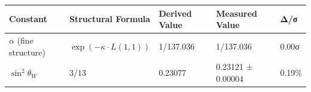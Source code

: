 \begin{longtable}[]{@{}lllll@{}}
\toprule
\begin{minipage}[b]{0.13\columnwidth}\raggedright
Constant\strut
\end{minipage} & \begin{minipage}[b]{0.25\columnwidth}\raggedright
Structural Formula\strut
\end{minipage} & \begin{minipage}[b]{0.20\columnwidth}\raggedright
Derived Value\strut
\end{minipage} & \begin{minipage}[b]{0.21\columnwidth}\raggedright
Measured Value\strut
\end{minipage} & \begin{minipage}[b]{0.07\columnwidth}\raggedright
Δ/σ\strut
\end{minipage}\tabularnewline
\midrule
\endhead
\begin{minipage}[t]{0.13\columnwidth}\raggedright
\(\alpha\) (fine structure)\strut
\end{minipage} & \begin{minipage}[t]{0.25\columnwidth}\raggedright
\(\exp(-\kappa \cdot L(1,1))\)\strut
\end{minipage} & \begin{minipage}[t]{0.20\columnwidth}\raggedright
1/137.036\strut
\end{minipage} & \begin{minipage}[t]{0.21\columnwidth}\raggedright
1/137.036\strut
\end{minipage} & \begin{minipage}[t]{0.07\columnwidth}\raggedright
0.00σ\strut
\end{minipage}\tabularnewline
\begin{minipage}[t]{0.13\columnwidth}\raggedright
\(\sin^2\theta_W\)\strut
\end{minipage} & \begin{minipage}[t]{0.25\columnwidth}\raggedright
\(3/13\)\strut
\end{minipage} & \begin{minipage}[t]{0.20\columnwidth}\raggedright
0.23077\strut
\end{minipage} & \begin{minipage}[t]{0.21\columnwidth}\raggedright
0.23121 ± 0.00004\strut
\end{minipage} & \begin{minipage}[t]{0.07\columnwidth}\raggedright
0.19\%\strut
\end{minipage}\tabularnewline

\end{longtable}
